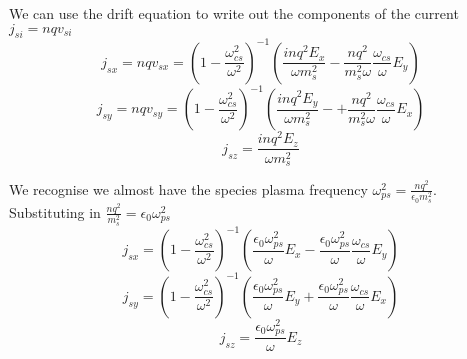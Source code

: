 We can use the drift equation to write out the components of the current $j_{si} = nqv_{si}$
\begin{equation}
	j_{sx} = nqv_{sx} = \left( 1 - \frac{\omega_{cs}^2}{\omega^2} \right)^{-1} \left( \frac{inq^2E_x}{\omega m_s^2} - \frac{nq^2}{m_s^2 \omega} \frac{\omega_{cs}}{\omega} E_y \right)
\end{equation}
\begin{equation}
	j_{sy} = nqv_{sy} = \left( 1 - \frac{\omega_{cs}^2}{\omega^2} \right)^{-1} \left( \frac{inq^2E_y}{\omega m_s^2} -+ \frac{nq^2}{m_s^2 \omega} \frac{\omega_{cs}}{\omega} E_x \right)
\end{equation}
\begin{equation}
	j_{sz} = \frac{inq^2 E_z}{\omega m_s^2}
\end{equation}

We recognise we almost have the species plasma frequency $\omega_{ps}^2 = \frac{nq^2}{\epsilon_0 m_s^2}$. Substituting in $\frac{nq^2}{m_s^2} = \epsilon_0 \omega_{ps}^2$
\begin{equation}
	j_{sx} = \left( 1 - \frac{\omega_{cs}^2}{\omega^2} \right)^{-1} \left( \frac{\epsilon_0 \omega_{ps}^2}{\omega} E_x - \frac{\epsilon_0 \omega_{ps}^2}{\omega} \frac{\omega_{cs}}{\omega} E_y \right)
\end{equation}
\begin{equation}
	j_{sy} = \left( 1 - \frac{\omega_{cs}^2}{\omega^2} \right)^{-1} \left( \frac{\epsilon_0 \omega_{ps}^2}{\omega} E_y + \frac{\epsilon_0 \omega_{ps}^2}{\omega} \frac{\omega_{cs}}{\omega} E_x \right)
\end{equation}
\begin{equation}
	j_{sz} = \frac{\epsilon_0 \omega_{ps}^2}{\omega} E_z
\end{equation}

